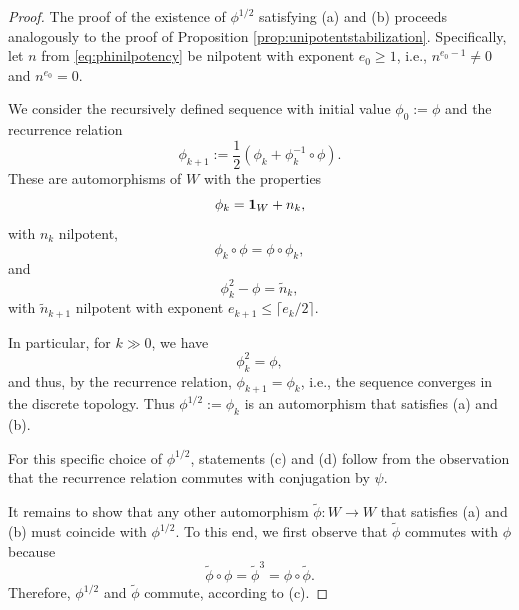 \documentclass[a4paper,12pt,reqno]{amsart}
\theoremstyle{plain}
\theoremstyle{remark}
\begin{document}
    \begin{proof}
      The proof of the existence of $\phi^{1/2}$ satisfying (a) and (b) proceeds analogously to the proof of Proposition \ref{prop:unipotentstabilization}. Specifically, let $n$ from \eqref{eq:phinilpotency} be nilpotent with exponent $e_0 \ge 1$, i.e., $n^{e_0-1} \neq 0$ and $n^{e_0}=0$.

      We consider the recursively defined sequence with initial value $\phi_0:=\phi$ and the recurrence relation
      \begin{equation}
        \phi_{k+1}:=\frac{1}{2}\left(\phi_k+\phi_{k}^{-1}\circ\phi\right).
      \end{equation}
      These are automorphisms of $W$ with the properties
      \begin{equation}
        \phi_k={\bf1}_{W}+n_k,
      \end{equation}
      with $n_k$ nilpotent,
      \begin{equation}
        \phi_k\circ\phi=\phi\circ\phi_k,
      \end{equation}
      and
      \begin{equation}
        \phi_k^2-\phi = \widetilde{n}_k,
      \end{equation}
      with $\widetilde{n}_{k+1}$ nilpotent with exponent $e_{k+1} \le \lceil e_k/2 \rceil$.

      In particular, for $k \gg 0$, we have
      \[
      \phi_k^2=\phi,
      \]
      and thus, by the recurrence relation, $\phi_{k+1} = \phi_k$, i.e., the sequence converges in the discrete topology. Thus $\phi^{1/2} := \phi_k$ is an automorphism that satisfies (a) and (b).

      For this specific choice of $\phi^{1/2}$, statements (c) and (d) follow from the observation that the recurrence relation commutes with conjugation by $\psi$.

      It remains to show that any other automorphism $\widetilde{\phi}\colon W \to W$ that satisfies (a) and (b) must coincide with $\phi^{1/2}$. To this end, we first observe that $\widetilde{\phi}$ commutes with $\phi$ because
      \[
      \widetilde{\phi}\circ\phi=\widetilde{\phi}^3=\phi\circ\widetilde{\phi}.
      \]
      Therefore, $\phi^{1/2}$ and $\widetilde{\phi}$ commute, according to (c).


\end{proof}
\end{document}
